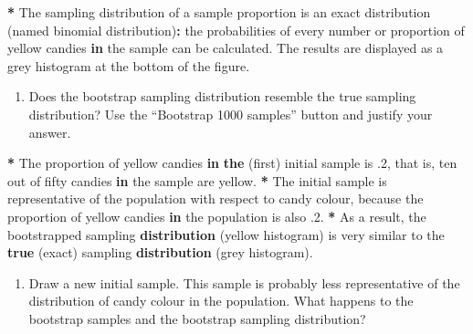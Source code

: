 \documentclass[a4paper]{book}
\newenvironment{Shaded}{\begin{snugshade}}{\end{snugshade}}
\newcommand{\KeywordTok}[1]{\textcolor[rgb]{0,0,0}{\textbf{#1}}}
\newcommand{\DecValTok}[1]{\textcolor[rgb]{0.00,0.00,0.00}{#1}}
\newcommand{\StringTok}[1]{\textcolor[rgb]{0.00,0.00,0.00}{#1}}
\newcommand{\ControlFlowTok}[1]{\textcolor[rgb]{0.00,0.00,0.00}{\textbf{#1}}}
\newcommand{\OperatorTok}[1]{\textcolor[rgb]{0.00,0.00,0.00}{\textbf{#1}}}
\newcommand{\NormalTok}[1]{#1}
\providecommand{\tightlist}{%
  \setlength{\itemsep}{0pt}\setlength{\parskip}{0pt}}
\theoremstyle{definition}
\theoremstyle{definition}
\theoremstyle{definition}
\theoremstyle{remark}
\begin{document}
\begin{Shaded}
\begin{Highlighting}[]
\OperatorTok{*}\StringTok{ }\NormalTok{The sampling distribution of a sample proportion is an exact distribution}
\NormalTok{(named binomial distribution)}\OperatorTok{:}\StringTok{ }\NormalTok{the probabilities of every number or proportion}
\NormalTok{of yellow candies }\ControlFlowTok{in}\NormalTok{ the sample can be calculated. The results are displayed}
\NormalTok{as a grey histogram at the bottom of the figure.}
\end{Highlighting}
\end{Shaded}

\begin{enumerate}
\def\labelenumi{\arabic{enumi}.}
\setcounter{enumi}{2}
\tightlist
\item
  Does the bootstrap sampling distribution resemble the true sampling
  distribution? Use the ``Bootstrap 1000 samples'' button and justify
  your answer.
\end{enumerate}

\begin{Shaded}
\begin{Highlighting}[]
\OperatorTok{*}\StringTok{ }\NormalTok{The proportion of yellow candies }\ControlFlowTok{in} \KeywordTok{the}\NormalTok{ (first) initial sample is .}\DecValTok{2}\NormalTok{, that}
\NormalTok{is, ten out of fifty candies }\ControlFlowTok{in}\NormalTok{ the sample are yellow.}
\OperatorTok{*}\StringTok{ }\NormalTok{The initial sample is representative of the population with respect to candy}
\NormalTok{colour, because the proportion of yellow candies }\ControlFlowTok{in}\NormalTok{ the population is also .}\DecValTok{2}\NormalTok{.}
\OperatorTok{*}\StringTok{ }\NormalTok{As a result, the bootstrapped sampling }\KeywordTok{distribution}\NormalTok{ (yellow histogram) is}
\NormalTok{very similar to the }\KeywordTok{true}\NormalTok{ (exact) sampling }\KeywordTok{distribution}\NormalTok{ (grey histogram).}
\end{Highlighting}
\end{Shaded}

\begin{enumerate}
\def\labelenumi{\arabic{enumi}.}
\setcounter{enumi}{3}
\tightlist
\item
  Draw a new initial sample. This sample is probably less representative
  of the distribution of candy colour in the population. What happens to
  the bootstrap samples and the bootstrap sampling distribution?
\end{enumerate}
\end{document}
